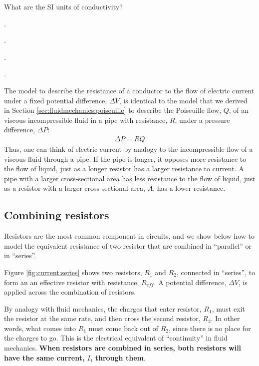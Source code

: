\begin{checkpoint}
	\begin{MCquestion}{What are the SI units of conductivity?}
		\item \SI{}{}.
		\item \SI{}{}. \correct
		\item \SI{}{}.
		\item \SI{}{}.
	\end{MCquestion}	
\end{checkpoint}


The model to describe the resistance of a conductor to the flow of electric current under a fixed potential difference, $\Delta V$, is identical to the model that we derived in Section \ref{sec:fluidmechanics:poiseuille} to describe the Poiseuille flow, $Q$, of an viscous incompressible fluid in a pipe with resistance, $R$, under a pressure difference, $\Delta P$:
\begin{align*}
\Delta P = RQ
\end{align*} 
Thus, one can think of electric current by analogy to the incompressible flow of a viscous fluid through a pipe. If the pipe is longer, it opposes more resistance to the flow of liquid, just as a longer resistor has a larger resistance to current. A pipe with a larger cross-sectional area has less resistance to the flow of liquid, just as a resistor with a larger cross sectional area, $A$, has a lower resistance.
\subsection{Combining resistors}
Resistors are the most common component in circuits, and we show below how to model the equivalent resistance of two resistor that are combined in ``parallel'' or in ``series''.

Figure \ref{fig:current:series} shows two resistors, $R_1$ and $R_2$, connected in ``series'', to form an an effective resistor with resistance, $R_{eff}$. A potential difference, $\Delta V$, is applied across the combination of resistors.

By analogy with fluid mechanics, the charges that enter resistor, $R_1$, must exit the resistor at the same rate, and then cross the second resistor, $R_2$. In other words, what comes into $R_1$ must come back out of $R_2$, since there is no place for the charges to go. This is the electrical equivalent of ``continuity'' in fluid mechanics. \textbf{When resistors are combined in series, both resistors will have the same current, $I$, through them}.

